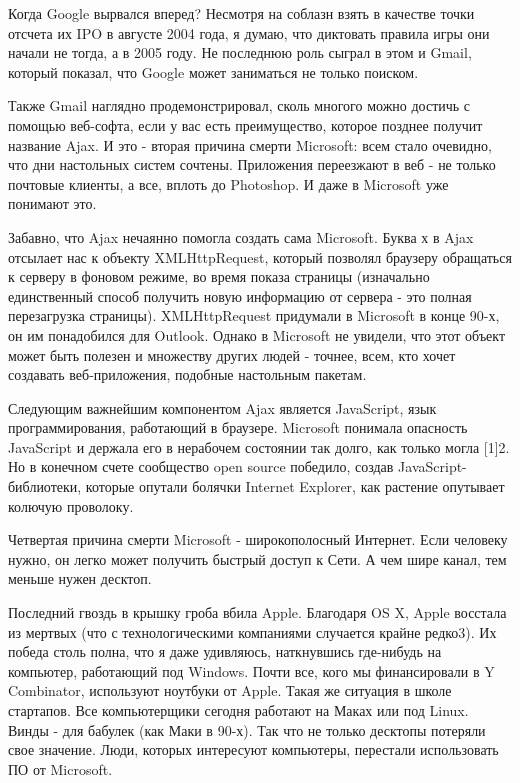 \documentclass[ebook,12pt,oneside,openany]{memoir}
\begin{document}
Когда Google вырвался вперед? Несмотря на соблазн взять в качестве
точки отсчета их IPO в августе 2004 года, я думаю, что диктовать
правила игры они начали не тогда, а в 2005 году. Не последнюю роль
сыграл в этом и Gmail, который показал, что Google может заниматься не
только поиском.

Также Gmail наглядно продемонстрировал, сколь многого можно достичь с
помощью веб-софта, если у вас есть преимущество, которое позднее
получит название Ajax. И это - вторая причина смерти Microsoft: всем
стало очевидно, что дни настольных систем сочтены. Приложения
переезжают в веб - не только почтовые клиенты, а все, вплоть до
Photoshop. И даже в Microsoft уже понимают это.

Забавно, что Ajax нечаянно помогла создать сама Microsoft. Буква х в
Ajax отсылает нас к объекту XMLHttpRequest, который позволял браузеру
обращаться к серверу в фоновом режиме, во время показа страницы
(изначально единственный способ получить новую информацию от сервера -
это полная перезагрузка страницы). XMLHttpRequest придумали в
Microsoft в конце 90-х, он им понадобился для Outlook. Однако в
Microsoft не увидели, что этот объект может быть полезен и множеству
других людей - точнее, всем, кто хочет создавать веб-приложения,
подобные настольным пакетам.

Следующим важнейшим компонентом Ajax является JavaScript, язык
программирования, работающий в браузере. Microsoft понимала опасность
JavaScript и держала его в нерабочем состоянии так долго, как только
могла [1]2. Но в конечном счете сообщество open source победило,
создав JavaScript-библиотеки, которые опутали болячки Internet
Explorer, как растение опутывает колючую проволоку.

Четвертая причина смерти Microsoft - широкополосный Интернет. Если
человеку нужно, он легко может получить быстрый доступ к Сети. А чем
шире канал, тем меньше нужен десктоп.

Последний гвоздь в крышку гроба вбила Apple. Благодаря OS X, Apple
восстала из мертвых (что с технологическими компаниями случается
крайне редко3). Их победа столь полна, что я даже удивляюсь,
наткнувшись где-нибудь на компьютер, работающий под Windows. Почти
все, кого мы финансировали в Y Combinator, используют ноутбуки от
Apple. Такая же ситуация в школе стартапов. Все компьютерщики сегодня
работают на Маках или под Linux. Винды - для бабулек (как Маки в
90-х). Так что не только десктопы потеряли свое значение. Люди,
которых интересуют компьютеры, перестали использовать ПО от Microsoft.
\end{document}

